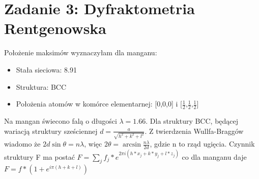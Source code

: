 \documentclass[a4paper,10pt]{article}
\begin{document}
\section{Zadanie 3: Dyfraktometria Rentgenowska}
Położenie maksimów wyznaczyłam dla manganu: 
\begin{itemize}
	\item Stała sieciowa: 8.91 %
\item Struktura: BCC
\item Położenia atomów w komórce elementarnej: [0,0,0] i [$\frac{1}{2}$,$\frac{1}{2}$,$\frac{1}{2}$]
\end{itemize}
Na mangan świecono falą o długości $\lambda = 1.66$. %
Dla struktury BCC, będącej wariacją struktury sześciennej $d=\frac{a}{\sqrt{h^2 +k^2 + l^2}}$. Z twierdzenia Wullfa-Braggów wiadomo że $2 d \sin{\theta} =n\lambda$, więc $2 \theta = \arcsin{\frac{n\lambda} {2 d}} $, gdzie n to rząd ugięcia. Czynnik struktury F ma postać $F=\sum\limits_j f_j * e^{2 \pi i(h*x_j+k*y_j+l*z_j)} $ co dla manganu daje $F=f *( 1+e^{i\pi (h+k+l)}) $ \\
\end{document}
